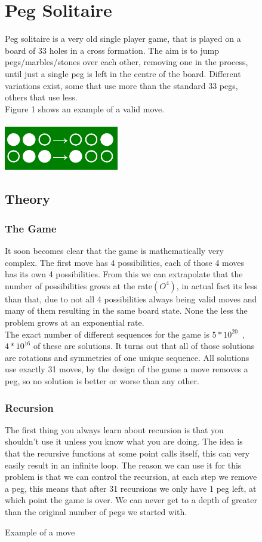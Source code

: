 \documentclass[11pt]{article}
\begin{document}
\begin{figure}
\section{Peg Solitaire}
Peg solitaire is a very old single player game, that is played on a board of 33 holes in a cross formation. The aim is to jump pegs/marbles/stones over each other, removing one in the process, until just a single peg is left in the centre of the board. Different variations exist, some that use more than the standard 33 pegs, others that use less.\\
Figure 1 shows an example of a valid move.\\\\
\includegraphics[width=5cm]{1}
\caption{Example of a move} 
\label{fig: 1}
\subsection{Theory}
\subsubsection*{The Game}
It soon becomes clear that the game is mathematically very complex. The first move has 4 possibilities, each of those 4 moves has its own 4 possibilities. From this we can extrapolate that the number of possibilities grows at the rate$(O^4)$, in actual fact its less than that, due to not all 4 possibilities always being valid moves and many of them resulting in the same board state. None the less the problem grows at an exponential rate.\\
The exact number of different sequences for the game is $5*10^{20}$~\cite{durango},  $4*10^{16}$ of these are solutions. It turns out that all of those solutions are rotations and symmetries of one unique sequence. 
All solutions use exactly 31 moves, by the design of the game a move removes a peg, so no solution is better or worse than any other.

\subsubsection*{Recursion}
The first thing you always learn about recursion is that you shouldn't use it unless you know what you are doing. The idea is that the recursive functions at some point calls itself, this can very easily result in an infinite loop. The reason we can use it for this problem is that we can control the recursion, at each step we remove a peg, this means that after 31 recursions we only have 1 peg left, at which point the game is over. We can never get to a depth of greater than the original number of pegs we started with. 
\end{figure}
\end{document}

